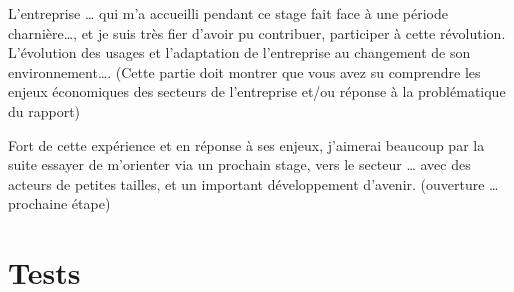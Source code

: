 \documentclass{article}
\begin{document}
L’entreprise … qui m’a accueilli pendant ce stage fait face à une période charnière…, et je suis très fier d’avoir pu contribuer, participer à cette révolution. L’évolution des usages et l’adaptation de l’entreprise au changement de son environnement….
(Cette partie doit montrer que vous avez su comprendre les enjeux économiques des secteurs de l’entreprise et/ou réponse à la problématique du rapport)


Fort de cette expérience et en réponse à ses enjeux, j’aimerai beaucoup par la suite essayer de m’orienter via un prochain stage, vers le secteur … avec des acteurs de petites tailles, et un important développement d’avenir.
(ouverture …prochaine étape)


\newpage
\section{Tests}
\end{document}
